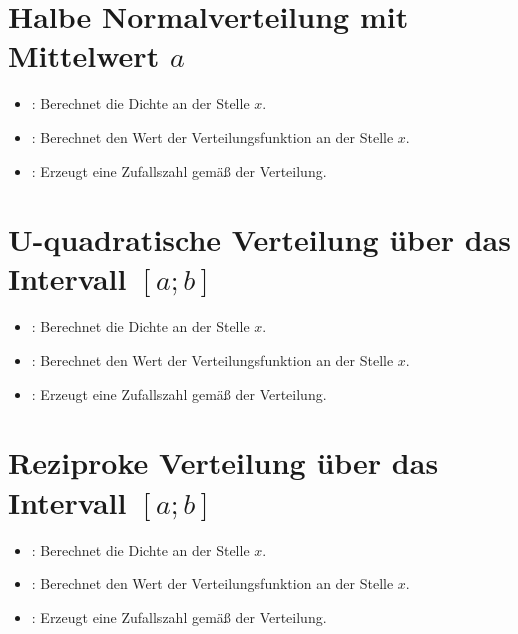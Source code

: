 \section{Halbe Normalverteilung mit Mittelwert \texorpdfstring{$a$}{a}}

\begin{itemize}

\item
{}:
Berechnet die Dichte an der Stelle $x$.

\item
{}:
Berechnet den Wert der Verteilungsfunktion an der Stelle $x$.

\item
{}:
Erzeugt eine Zufallszahl gemäß der Verteilung.

\end{itemize}



\section{U-quadratische Verteilung über das Intervall \texorpdfstring{$[a;b]$}{[a;b]}}

\begin{itemize}

\item
{}:
Berechnet die Dichte an der Stelle $x$.

\item
{}:
Berechnet den Wert der Verteilungsfunktion an der Stelle $x$.

\item
{}:
Erzeugt eine Zufallszahl gemäß der Verteilung.

\end{itemize}



\section{Reziproke Verteilung über das Intervall \texorpdfstring{$[a;b]$}{[a;b]}}

\begin{itemize}

\item
{}:
Berechnet die Dichte an der Stelle $x$.

\item
{}:
Berechnet den Wert der Verteilungsfunktion an der Stelle $x$.

\item
{}:
Erzeugt eine Zufallszahl gemäß der Verteilung.

\end{itemize}



